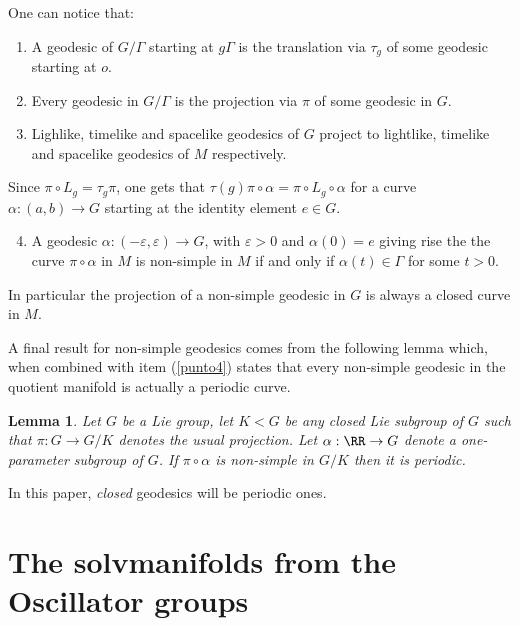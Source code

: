 \documentclass[12pt]{amsart}
\theoremstyle{plain}
\newtheorem{lem}[thm]{Lemma}
\theoremstyle{definition}
\theoremstyle{remark}
\begin{document}
One can notice that: 
	
	\begin{enumerate}
		\item A geodesic of $G/\Gamma$ starting at $g\Gamma$ is the translation via $\tau_g$ of some geodesic starting at $o$. \label{punto1}
		\item Every geodesic in $G/\Gamma$ is the projection via $\pi$ of some geodesic in $G$.\label{punto2}
		\item Lighlike, timelike and spacelike geodesics of $G$ project to lightlike, timelike and spacelike geodesics of $M$ respectively.
	\end{enumerate}
	
Since $\pi \circ L_g = \tau_g \pi$, one gets that $\tau(g)\pi\circ \alpha=\pi\circ L_g \circ \alpha$ for a curve $\alpha:(a,b)\to G$ starting at the identity element  $e\in G$. 

	\begin{enumerate}
		\setcounter{enumi}{3}
		
		\item A geodesic $\alpha: (-\varepsilon, \varepsilon) \to G$, with $\varepsilon>0$ and   $\alpha(0)=e$   giving rise the the curve $\pi\circ \alpha$ in $M$  is non-simple in $M$ if and only if  $\alpha(t) \in \Gamma$ for some $t>0$.\label{punto4}
	\end{enumerate}
	In particular the projection of a non-simple geodesic in $G$ is always a closed curve in $M$.
	

	
	A final result for non-simple geodesics comes from the following lemma which, when combined with item (\ref{punto4}) states that every non-simple geodesic in the quotient manifold is actually a periodic curve. 
	
	\begin{lem}\cite{BOV}  Let $G$ be a Lie group, let $K < G$ be any closed Lie  subgroup of $G$ such that  $\pi: G \to G/K$ denotes the 
		usual projection. Let $\alpha: \RR \to G$ denote a  one-parameter subgroup of $G$.
		If $\pi \circ \alpha$ is non-simple in $G/K$ then it is periodic.
	\end{lem}
	
In this paper, {\em closed} geodesics will be periodic ones.
	

	
	\section{The solvmanifolds from the Oscillator groups}\label{sectionosc}
	
\end{document}

